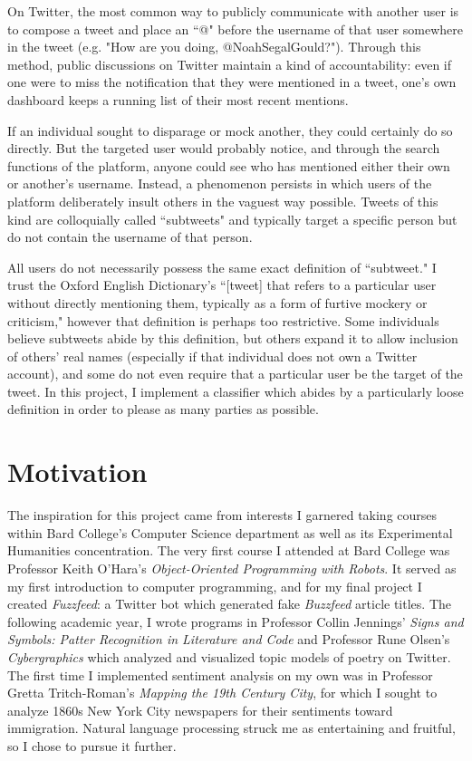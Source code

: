\documentclass[11pt, twoside, reqno]{book}
\begin{document}
On Twitter, the most common way to publicly communicate with another user is to compose a tweet and place an ``@" before the username of that user somewhere in the tweet (e.g. "How are you doing, @NoahSegalGould?"). Through this method, public discussions on Twitter maintain a kind of accountability: even if one were to miss the notification that they were mentioned in a tweet, one's own dashboard keeps a running list of their most recent mentions. 

If an individual sought to disparage or mock another, they could certainly do so directly. But the targeted user would probably notice, and through the search functions of the platform, anyone could see who has mentioned either their own or another's username. Instead, a phenomenon persists in which users of the platform deliberately insult others in the vaguest way possible. Tweets of this kind are colloquially called ``subtweets" and typically target a specific person but do not contain the username of that person.

All users do not necessarily possess the same exact definition of ``subtweet." I trust the Oxford English Dictionary's ``[tweet] that refers to a particular user without directly mentioning them, typically as a form of furtive mockery or criticism," however that definition is perhaps too restrictive. Some individuals believe subtweets abide by this definition, but others expand it to allow inclusion of others' real names (especially if that individual does not own a Twitter account), and some do not even require that a particular user be the target of the tweet. In this project, I implement a classifier which abides by a particularly loose definition in order to please as many parties as possible. 

\section{Motivation}
\label{motivation_and_prior_work}

The inspiration for this project came from interests I garnered taking courses within Bard College's Computer Science department as well as its Experimental Humanities concentration. The very first course I attended at Bard College was Professor Keith O'Hara's \textit{Object-Oriented Programming with Robots}. It served as my first introduction to computer programming, and for my final project I created \textit{Fuzzfeed}: a Twitter bot which generated fake \textit{Buzzfeed} article titles. The following academic year, I wrote programs in Professor Collin Jennings' \textit{Signs and Symbols: Patter Recognition in Literature and Code} and Professor Rune Olsen's \textit{Cybergraphics} which analyzed and visualized topic models of poetry on Twitter. The first time I implemented sentiment analysis on my own was in Professor Gretta Tritch-Roman's \textit{Mapping the 19th Century City}, for which I sought to analyze 1860s New York City newspapers for their sentiments toward immigration. Natural language processing struck me as entertaining and fruitful, so I chose to pursue it further.
\end{document}
